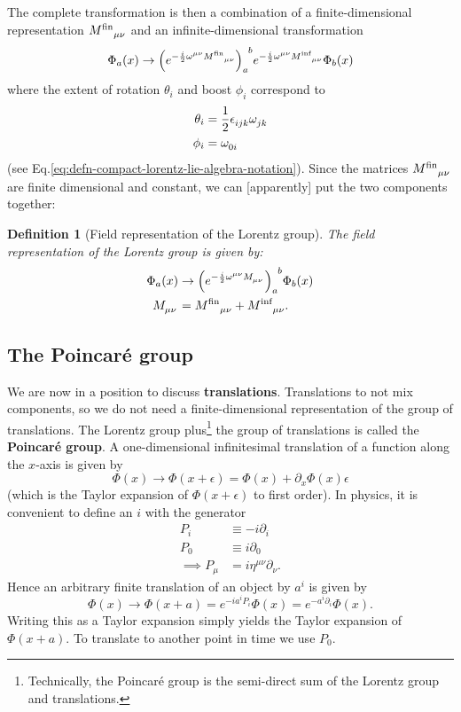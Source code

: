 \documentclass[11pt]{article}
\numberwithin{equation}{section}
\newcommand{\tn}[2]{\tensor{#1}{#2}}
\newtheorem{defn}{Definition}[section]
\begin{document}
The complete transformation is then a combination of a finite-dimensional representation $\tn{{M^{\text{fin}}}}{_\mu_\nu}$ and an infinite-dimensional transformation
\begin{equation}
\Phi_a(x) \rightarrow \tn{{\left( e^{-\frac{i}{2} \omega^{\mu \nu} \tn{{M^{\text{fin}}}}{_\mu_\nu}} \right)}}{_a^b}  e^{-\frac{i}{2} \omega^{\mu \nu} \tn{{M^{\text{inf}}}}{_\mu_\nu}} \Phi_b(x)
\end{equation}
where the extent of rotation $\theta_i$ and boost $\phi_i$ correspond to
\begin{align}
\theta_i &= \frac{1}{2}\tn{\epsilon}{_i_j_k} \tn{\omega}{_j_k} \\
\phi_i &= \tn{\omega}{_0_i}
\end{align}
(see Eq.\eqref{eq:defn-compact-lorentz-lie-algebra-notation}). Since the matrices $ \tn{{M^{\text{fin}}}}{_\mu_\nu}$ are finite dimensional and constant, we can [apparently] put the two components together:
\begin{defn}[Field representation of the Lorentz group]
The field representation of the Lorentz group is given by:
\begin{align}
\Phi_a(x) &\rightarrow \tn{{\left( e^{-\frac{i}{2} \omega^{\mu \nu} \tn{M}{_\mu_\nu}} \right)}}{_a^b}   \Phi_b(x) \\
\tn{M}{_\mu_\nu} &= \tn{{M^{\text{fin}}}}{_\mu_\nu} + \tn{{M^{\text{inf}}}}{_\mu_\nu}.
\end{align}
\end{defn}

\subsection{The Poincar\'{e} group}

We are now in a position to discuss \textbf{translations}. Translations to not mix components, so we do not need a finite-dimensional representation of the group of translations. The Lorentz group plus\footnote{Technically, the Poincar\'{e} group is the semi-direct sum of the Lorentz group and translations.} the group of translations is called the \textbf{Poincar\'{e} group}. A one-dimensional infinitesimal translation of a function along the $x$-axis is given by
\begin{equation}
\Phi(x) \rightarrow \Phi(x+\epsilon) = \Phi(x) + \partial_x \Phi(x) \epsilon
\end{equation}
(which is the Taylor expansion of $\Phi(x+\epsilon)$ to first order). In physics, it is convenient to define an $i$ with the generator
\begin{align}
P_i &\equiv -i \partial_i \\
P_0 &\equiv i \partial_0 \\
\implies P_\mu &= i \eta^{\mu \nu} \partial_\nu.
\end{align}
Hence an arbitrary finite translation of an object by $a^i$ is given by
\begin{equation}
\Phi(x) \rightarrow \Phi(x+a) = e^{-ia^iP_i}\Phi(x) = e^{-a^i\partial_i}\Phi(x).
\end{equation}
Writing this as a Taylor expansion simply yields the Taylor expansion of $\Phi(x+a)$. To translate to another point in time we use $P_0$.
\end{document}
